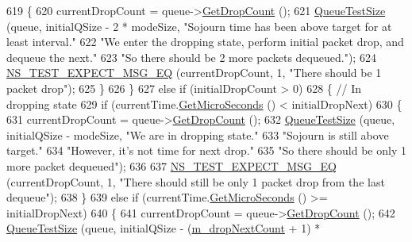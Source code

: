 \begin{DoxyCode}
619             \{
620               currentDropCount = queue->\hyperlink{classns3_1_1CoDelQueueDisc_a8af7efb44124c9fd4699de0d71c5a58d}{GetDropCount} ();
621               \hyperlink{classCoDelQueueDiscBasicDrop_a61137d83489ec151993b89863f9928c4}{QueueTestSize} (queue, initialQSize - 2 * modeSize, \textcolor{stringliteral}{"Sojourn time has been above
       target for at least interval."}
622                                      \textcolor{stringliteral}{"We enter the dropping state, perform initial packet drop, and dequeue
       the next."}
623                                      \textcolor{stringliteral}{"So there should be 2 more packets dequeued."});
624               \hyperlink{group__testing_ga7304ba46a28d8cf08dfdfd6499cf7068}{NS\_TEST\_EXPECT\_MSG\_EQ} (currentDropCount, 1, \textcolor{stringliteral}{"There should be 1 packet
       drop"});
625             \}
626         \}
627       \textcolor{keywordflow}{else} \textcolor{keywordflow}{if} (initialDropCount > 0)
628         \{ \textcolor{comment}{// In dropping state}
629           \textcolor{keywordflow}{if} (currentTime.\hyperlink{classns3_1_1Time_a2542b9273c336da11fcaf54e8bc6e4c8}{GetMicroSeconds} () < initialDropNext)
630             \{
631               currentDropCount = queue->\hyperlink{classns3_1_1CoDelQueueDisc_a8af7efb44124c9fd4699de0d71c5a58d}{GetDropCount} ();
632               \hyperlink{classCoDelQueueDiscBasicDrop_a61137d83489ec151993b89863f9928c4}{QueueTestSize} (queue, initialQSize - modeSize, \textcolor{stringliteral}{"We are in dropping state."}
633                                      \textcolor{stringliteral}{"Sojourn is still above target."}
634                                      \textcolor{stringliteral}{"However, it's not time for next drop."}
635                                      \textcolor{stringliteral}{"So there should be only 1 more packet dequeued"});
636 
637               \hyperlink{group__testing_ga7304ba46a28d8cf08dfdfd6499cf7068}{NS\_TEST\_EXPECT\_MSG\_EQ} (currentDropCount, 1, \textcolor{stringliteral}{"There should still be only
       1 packet drop from the last dequeue"});
638             \}
639           \textcolor{keywordflow}{else} \textcolor{keywordflow}{if} (currentTime.\hyperlink{classns3_1_1Time_a2542b9273c336da11fcaf54e8bc6e4c8}{GetMicroSeconds} () >= initialDropNext)
640             \{
641               currentDropCount = queue->\hyperlink{classns3_1_1CoDelQueueDisc_a8af7efb44124c9fd4699de0d71c5a58d}{GetDropCount} ();
642               \hyperlink{classCoDelQueueDiscBasicDrop_a61137d83489ec151993b89863f9928c4}{QueueTestSize} (queue, initialQSize - (\hyperlink{classCoDelQueueDiscBasicDrop_a64c30d2e4ddd98c5c71e7235d1435c59}{m\_dropNextCount} + 1) * 

\end{DoxyCode}

